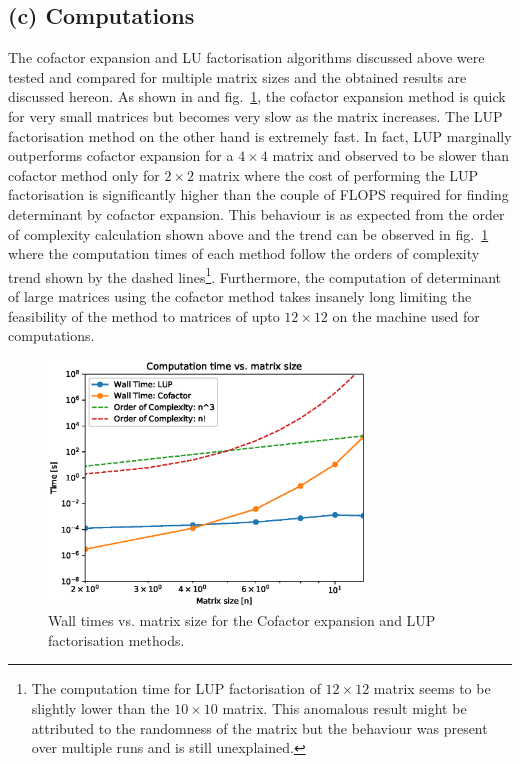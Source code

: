 \documentclass[11pt, oneside]{article}
\begin{document}
\subsection*{(c) Computations}
The cofactor expansion and LU factorisation algorithms discussed above were tested and compared for multiple matrix sizes and the obtained results are discussed hereon. As shown in and fig.~\ref{fig:1}, the cofactor expansion method is quick for very small matrices but becomes very slow as the matrix increases. The LUP factorisation method on the other hand is extremely fast. In fact, LUP marginally outperforms cofactor expansion for a $4\times4$ matrix and observed to be slower than cofactor method only for $2\times2$ matrix where the cost of performing the LUP factorisation is significantly higher than the couple of FLOPS required for finding determinant by cofactor expansion. This behaviour is as expected from the order of complexity calculation shown above and the trend can be observed in fig.~\ref{fig:1} where the computation times of each method follow the orders of complexity trend shown by the dashed lines\footnote{The computation time for LUP factorisation of $12\times12$ matrix seems to be slightly lower than the $10\times10$ matrix. This anomalous result might be attributed to the randomness of the matrix but the behaviour was present over multiple runs and is still unexplained.}. Furthermore, the computation of determinant of large matrices using the cofactor method takes insanely long limiting the feasibility of the method to matrices of upto $12\times12$ on the machine used for computations.
  \begin{figure}[]
        \centering
        \includegraphics[width=0.75\textwidth]{figure/Figure_1.eps}
        \caption{Wall times vs. matrix size for the Cofactor expansion and LUP factorisation methods.}
        \label{fig:1}
  \end{figure}
\end{document}
